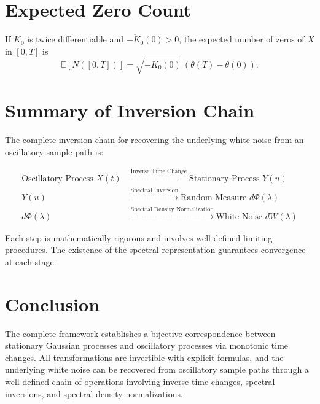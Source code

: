 \documentclass{article}
\begin{document}
\section{Expected Zero Count}

If $K_0$ is twice differentiable and $-\ddot{K}_0(0)>0$, the expected number of zeros of $X$ in $[0,T]$ is
\[
\mathbb{E}[N([0,T])] = \sqrt{-\ddot{K}_0(0)}\, (\theta(T)-\theta(0)).
\]

\section{Summary of Inversion Chain}

The complete inversion chain for recovering the underlying white noise from an oscillatory sample path is:

\begin{align}
\text{Oscillatory Process } X(t) &\xrightarrow{\text{Inverse Time Change}} \text{Stationary Process } Y(u) \\
Y(u) &\xrightarrow{\text{Spectral Inversion}} \text{Random Measure } d\Phi(\lambda) \\
d\Phi(\lambda) &\xrightarrow{\text{Spectral Density Normalization}} \text{White Noise } dW(\lambda)
\end{align}

Each step is mathematically rigorous and involves well-defined limiting procedures. The existence of the spectral representation guarantees convergence at each stage.


\section{Conclusion}

The complete framework establishes a bijective correspondence between stationary Gaussian processes and oscillatory processes via monotonic time changes. All transformations are invertible with explicit formulas, and the underlying white noise can be recovered from oscillatory sample paths through a well-defined chain of operations involving inverse time changes, spectral inversions, and spectral density normalizations.
\end{document}
